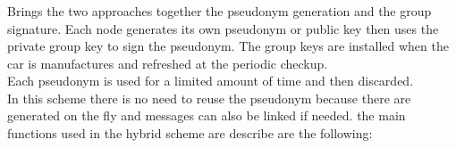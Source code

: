 \subsubsection{\hybrid}
Brings the two approaches together the pseudonym generation and the group signature. Each node generates its own
pseudonym or public key then uses the private group key to sign the pseudonym. The group keys are installed when the car is manufactures and refreshed at the periodic checkup.\\
Each pseudonym is used for a limited amount of time and then discarded.\\
In this scheme there is no need to reuse the pseudonym because there are generated on the fly and messages can also be linked if needed.  
the main functions used in the hybrid scheme are describe are the following:


